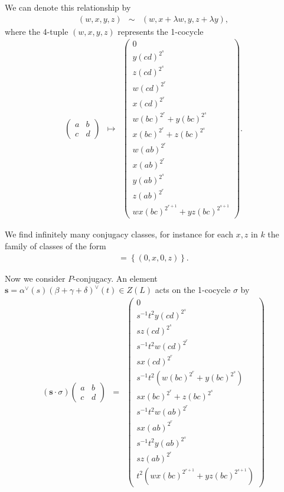 We can denote this relationship by
\begin{eqnarray*}
(w,x,y,z) &\sim& (w, x+\lambda w, y, z + \lambda y),
\end{eqnarray*}
where the 4-tuple $(w,x,y,z)$ represents the 1-cocycle 
\begin{eqnarray*}
\left(\begin{matrix} a & b \\ c & d \end{matrix}\right) &\mapsto&
\left(\begin{matrix}
0 \\
y(cd)^{2^s} \\
z(cd)^{2^s} \\
w(cd)^{2^r} \\
x(cd)^{2^r} \\
w(bc)^{2^r} + y(bc)^{2^s} \\
x(bc)^{2^r} + z(bc)^{2^s} \\
w(ab)^{2^r} \\
x(ab)^{2^r}  \\
y(ab)^{2^s} \\
z(ab)^{2^r} \\
wx(bc)^{2^{r+1}} + yz(bc)^{2^{s+1}}
\end{matrix}\right).
\end{eqnarray*}

We find infinitely many conjugacy classes, for instance for each $x, z$ in $k$ the family of classes of the form
\begin{eqnarray*}
[(0,x,0,z)] = \left\{(0,x,0,z)\right\}.
\end{eqnarray*}

Now we consider $P$-conjugacy. An element $\mathbf{s} = \alpha^\vee(s)(\beta + \gamma + \delta)^\vee(t)\in Z(L)$ acts on the 1-cocycle $\sigma$ by
\begin{eqnarray*}
(\mathbf{s}\cdot\sigma)\left(\begin{matrix} a & b \\ c & d\end{matrix}\right)
&=&
\left(\begin{matrix}
0 \\
s^{-1}t^{2}y(cd)^{2^s} \\
sz(cd)^{2^s} \\
s^{-1}t^{2}w(cd)^{2^r} \\
sx(cd)^{2^r} \\
s^{-1}t^{2}(w(bc)^{2^r} + y(bc)^{2^s}) \\
sx(bc)^{2^r} + z(bc)^{2^s} \\
s^{-1}t^{2}w(ab)^{2^r} \\
sx(ab)^{2^r}  \\
s^{-1}t^{2}y(ab)^{2^s} \\
sz(ab)^{2^r} \\
t^2(wx(bc)^{2^{r+1}} + yz(bc)^{2^{s+1}})
\end{matrix}\right)
\end{eqnarray*}



